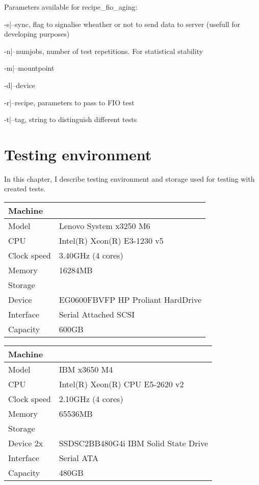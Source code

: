 \documentclass[
  color, %
  table, %
  lof,   %
  lot,   %
]{fithesis3}
\begin{document}
Parameters available for recipe\_fio\_aging:
\begin{compactenum}
  \item -s|--sync, flag to signalise wheather or not to send data to server (usefull for developing purposes)
  \item -n|--numjobs, number of test repetitions. For statistical stability
  \item -m|--mountpoint
  \item -d|--device
  \item -r|--recipe, parameters to pass to FIO test
  \item -t|--tag, string to distinguish different tests
  \end{compactenum}

\chapter{Testing environment}
In this chapter, I describe testing environment and storage used for testing with created tests.

\begin{tabular}{|l|l|}
\hline
   \multicolumn{2}{|l|}{Machine} \\ \hline
    Model & Lenovo System x3250 M6 \\
    \hline
    CPU & Intel(R) Xeon(R) E3-1230 v5 \\
    \hline
    Clock speed & 3.40GHz (4 cores) \\
    \hline
    Memory & 16284MB \\
    \hline
    \multicolumn{2}{|l|}{Storage} \\ \hline
    Device & EG0600FBVFP HP Proliant HardDrive \\ \hline
    Interface & Serial Attached SCSI\\ \hline
    Capacity & 600GB\\ \hline
\end{tabular}

\begin{tabular}{|l|l|}
\hline
   \multicolumn{2}{|l|}{Machine} \\ \hline
    Model & IBM x3650 M4 \\
    \hline
    CPU & Intel(R) Xeon(R) CPU E5-2620 v2 \\
    \hline
    Clock speed & 2.10GHz  (4 cores) \\
    \hline
    Memory &  65536MB\\
    \hline
    \multicolumn{2}{|l|}{Storage} \\ \hline
    Device 2x & SSDSC2BB480G4i IBM Solid State Drive \\ \hline
    Interface &  Serial ATA\\ \hline
    Capacity & 480GB\\ \hline
\end{tabular}
\end{document}
